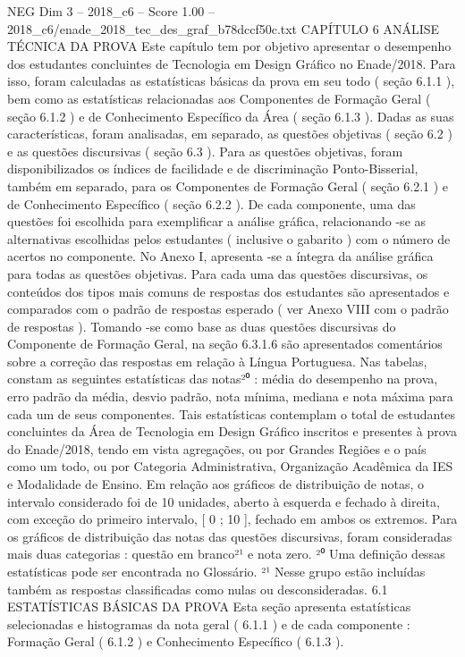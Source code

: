 \begin{textsample}{NEG Dim 3 – 2018\_c6 – Score 1.00 – 2018\_c6/enade\_2018\_tec\_des\_graf\_b78dccf50c.txt}  \label{ex:f3_neg_173}
CAPÍTULO 6 ANÁLISE TÉCNICA DA PROVA Este capítulo tem por objetivo apresentar o desempenho dos estudantes concluintes de Tecnologia em Design Gráfico no Enade/2018.
Para isso, foram calculadas as estatísticas básicas da prova em seu todo ( seção 6.1.1 ), bem como as estatísticas relacionadas aos Componentes de Formação Geral ( seção 6.1.2 ) e de Conhecimento Específico da Área ( seção 6.1.3 ).
Dadas as suas características, foram analisadas, em separado, as questões objetivas ( seção 6.2 ) e as questões discursivas ( seção 6.3 ).
Para as questões objetivas, foram disponibilizados os índices de facilidade e de discriminação Ponto-Bisserial, também em separado, para os Componentes de Formação Geral ( seção 6.2.1 ) e de Conhecimento Específico ( seção 6.2.2 ).
De cada componente, uma das questões foi escolhida para exemplificar a análise gráfica, relacionando -se as alternativas escolhidas pelos estudantes ( inclusive o gabarito ) com o número de acertos no componente.
No Anexo I, apresenta -se a íntegra da análise gráfica para todas as questões objetivas.
Para cada uma das questões discursivas, os conteúdos dos tipos mais comuns de respostas dos estudantes são apresentados e comparados com o padrão de respostas esperado ( ver Anexo VIII com o padrão de respostas ).
Tomando -se como base as duas questões discursivas do Componente de Formação Geral, na seção 6.3.1.6 são apresentados comentários sobre a correção das respostas em relação à Língua Portuguesa.
Nas tabelas, constam as seguintes estatísticas das notas²⁰ : média do desempenho na prova, erro padrão da média, desvio padrão, nota mínima, mediana e nota máxima para cada um de seus componentes.
Tais estatísticas contemplam o total de estudantes concluintes da Área de Tecnologia em Design Gráfico inscritos e presentes à prova do Enade/2018, tendo em vista agregações, ou por Grandes Regiões e o país como um todo, ou por Categoria Administrativa, Organização Acadêmica da IES e Modalidade de Ensino.
Em relação aos gráficos de distribuição de notas, o intervalo considerado foi de 10 unidades, aberto à esquerda e fechado à direita, com exceção do primeiro intervalo, [ 0 ; 10 ], fechado em ambos os extremos.
Para os gráficos de distribuição das notas das questões discursivas, foram consideradas mais duas categorias : questão em branco²¹ e nota zero. ²⁰ Uma definição dessas estatísticas pode ser encontrada no Glossário. ²¹ Nesse grupo estão incluídas também as respostas classificadas como nulas ou desconsideradas. 6.1 ESTATÍSTICAS BÁSICAS DA PROVA Esta seção apresenta estatísticas selecionadas e histogramas da nota geral ( 6.1.1 ) e de cada componente : Formação Geral ( 6.1.2 ) e Conhecimento Específico ( 6.1.3 ).

\end{textsample}
